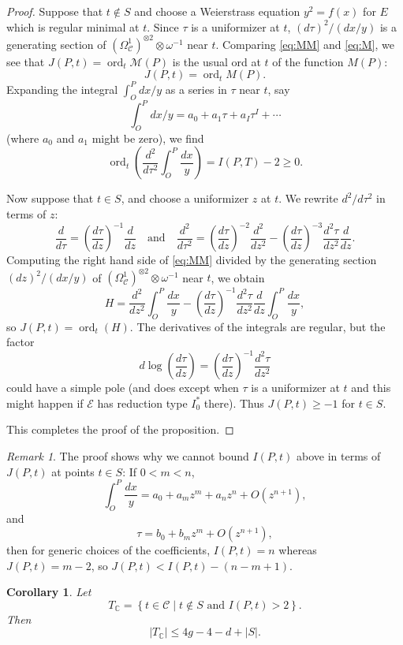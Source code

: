 \documentclass[12pt,reqno]{amsart}
\numberwithin{equation}{section}
\theoremstyle{plain}
\newtheorem{cor}[subsection]{Corollary}
\theoremstyle{definition}
\theoremstyle{remark}
\newtheorem{rem}[subsection]{Remark}
\newcommand{\CC}{\mathcal{C}}
\newcommand{\EE}{\mathcal{E}}
\newcommand{\MM}{\mathcal{M}}
\newcommand{\C}{\mathbb{C}}
\newcommand{\<}{\langle}
\renewcommand{\>}{\rangle}
\newcommand{\tensor}{\otimes}
\DeclareMathOperator{\ord}{ord}
\numberwithin{equation}{section}
\renewcommand{\and}{\quad\text{and}\quad}
\begin{document}
\begin{proof}
Suppose that $t\not\in S$ and choose a Weierstrass equation $y^2=f(x)$
for $E$ which is regular minimal at $t$.  Since $\tau$ is a
uniformizer at $t$, $(d\tau)^2/(dx/y)$ is a generating section of
$\left(\Omega^1_\CC\right)^{\tensor2}\tensor\omega^{-1}$ near $t$.
Comparing \eqref{eq:MM} and \eqref{eq:M}, we see that
$J(P,t)=\ord_t\MM(P)$ is the usual ord at $t$ of the function $M(P)$:
\[J(P,t)=\ord_tM(P).\]
Expanding the integral $\int_O^Pdx/y$ as a series in $\tau$ near $t$,
say
\[\int_O^Pdx/y=a_0+a_1\tau+a_I\tau^I+\cdots\]
(where $a_0$ and $a_1$ might be zero), we find
\[\ord_t\left(\frac{d^2}{d\tau^2}\int_O^P\frac{dx}y\right)
  =I(P,T)-2\ge0.\]

Now suppose that $t\in S$, and choose a uniformizer $z$ at $t$.  We
rewrite $d^2/d\tau^2$ in terms of $z$:
\[\frac{d}{d\tau}=\left(\frac{d\tau}{dz}\right)^{-1}\frac{d}{dz}
  \and
  \frac{d^2}{d\tau^2}=\left(\frac{d\tau}{dz}\right)^{-2}\frac{d^2}{dz^2}
  -\left(\frac{d\tau}{dz}\right)^{-3}\frac{d^2\tau}{dz^2}\frac{d}{dz}.
\]  
Computing the right hand side of \eqref{eq:MM} divided by the
generating section $(dz)^2/(dx/y)$ of
$\left(\Omega^1_\CC\right)^{\tensor2}\tensor\omega^{-1}$ near $t$,
we obtain
\[H=\frac{d^2}{dz^2}\int_O^P\frac{dx}y
  -\left(\frac{d\tau}{dz}\right)^{-1}\frac{d^2\tau}{dz^2}
  \frac{d}{dz}\int_O^P\frac{dx}y,\]
so $J(P,t)=\ord_t(H)$.  The derivatives of the integrals are regular,
but the factor
\[d\log\left(\frac{d\tau}{dz}\right)
  =\left(\frac{d\tau}{dz}\right)^{-1}\frac{d^2\tau}{dz^2}\]
could have a simple pole (and does except when $\tau$ is a
uniformizer at $t$ and this might happen if $\EE$ has reduction
type $I_0^*$ there).  Thus
$J(P,t)\ge-1$ for $t\in S$.

This completes the proof of the proposition.
\end{proof}

\begin{rem}
  The proof shows why we cannot bound $I(P,t)$ above in terms of
  $J(P,t)$ at points $t\in S$:  If $0<m<n$,
  \[\int_O^P\frac{dx}y=a_0+a_mz^m+a_nz^n+O(z^{n+1}),\]
  and
  \[\tau=b_0+b_mz^m+O(z^{n+1}),\]
  then for generic choices of the coefficients, $I(P,t)=n$ whereas
  $J(P,t)=m-2$, so $J(P,t)<I(P,t)-(n-m+1)$.  
\end{rem}

\begin{cor}\label{cor:bound-C}
  Let
  \[T_\C=\left\{t\in\CC\mid \text{$t\not\in S$ and $I(P,t)>2$}\right\}.\]
  Then
  \[|T_\C|\le 4g-4-d+|S|.\]
\end{cor}
\end{document}
